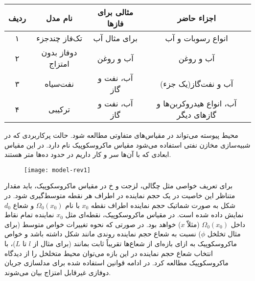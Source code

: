 \begin{table}
\centering
{}
\label{tab:2model}
\begin{tabular}{|c|c|c|c|}
\hline
ردیف &نام مدل &مثالی برای فاز‌ها &اجزاء حاضر  \\
\hline
۱ &تک‌فاز چند‌جزء &برای مثال آب  &انواع رسوبات و آب \\
۲ &دو‌فاز بدون امتزاج &آب و روغن &آب و روغن  \\
۳ &نفت‌سیاه &آب، نفت و گاز &آب و نفت‌گاز(یک جزء)  \\
۴ &ترکیبی &آب، نفت و گاز &آب، انواع هیدروکربن‌ها و گاز‌های دیگر  \\
\hline
\end{tabular}
\end{table}

محیط پیوسته می‌تواند در مقیاس‌های متفاوتی مطالعه شود. حالت پرکاربردی که در شبیه‌سازی مخازن نفتی استفاده می‌شود مقیاس ماکروسکوپیک  نام دارد. در این مقیاس ابعادی که با آن‌ها سر و کار داریم در حدود ده‌ها متر هستند.
\begin{figure}
\texttt{[image: model-rev1]}
\label{fig:2rev1}
\end{figure}


 برای تعریف خواصی مثل چگالی، لزجت و ‌خ{} در  مقیاس ماکروسکوپیک، باید مقدار متناظر این خاصیت در یک حجم نماینده در اطراف هر نقطه متوسط‌گیری شود. در شکل  به صورت شماتیک حجم نماینده اطراف نقطه $x_0$ با نام
 $\Omega_0(x_0)$
 و شعاع $d_0$ نمایش داده شده است. در مقیاس ماکروسکوپیک، نقطه‌ای مثل $x_0$ نماینده تمام نقاط داخل 
 $\Omega_0(x_0)$
(مثلاّ $x$) خواهد بود. در صورتی که نحوه تغییرات خواص متوسط (برای مثال تخلخل $\phi$) نسبت به شعاع حجم نماینده روندی مانند شکل   داشته باشد و خواص ماکروسکوپیک به ازای بازه‌ای از شعاع‌ها تقریباً ثابت بمانند (برای مثال از $l$ تا $L$)، با انتخاب شعاع حجم نماینده در این بازه می‌توان محیط متخلخل را از دیدگاه ماکروسکوپیک مطالعه کرد. در ادامه قوانین استفاده شده برای مدلسازی جریان دوفازی غیر‌قابل امتزاج بیان می‌شوند.

